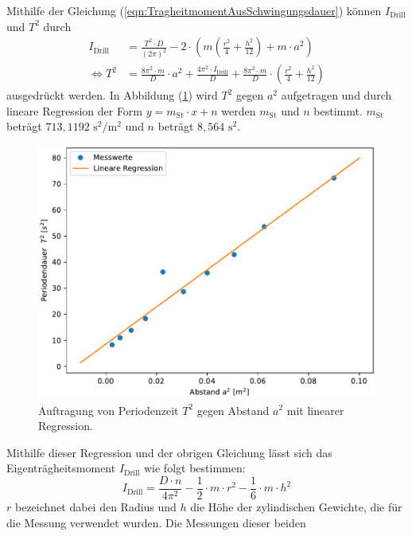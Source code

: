   Mithilfe der Gleichung (\ref{eqn:TragheitmomentAusSchwingungsdauer})
  können $I_{\text{Drill}}$ und $T^2$ durch
  \begin{align}
    I_{\text{Drill}} &= \frac{T^{2} \cdot D}{\left(2 \pi\right)^{2}} - 2 \cdot \left(m \left(\frac{r^{2}}{4} + \frac{h^{2}}{12} \right) + m \cdot a^2 \right) \\
    \Leftrightarrow T^2 &= \frac{8 \pi^2 \cdot m}{D} \cdot a^2 + \frac{4 \pi^2 \cdot I_{\text{Drill}}}{D} + \frac{8\pi^2 \cdot m}{D} \cdot \left( \frac{r^2}{4} + \frac{h^2}{12} \right)
  \end{align}
  ausgedrückt werden.
  In Abbildung (\ref{fig:plot}) wird $T^2$ gegen $a^2$ aufgetragen und durch lineare Regression der Form $y = m_{\text{St}} \cdot x + n$ werden $m_{\text{St}}$ und $n$ bestimmt.
  $m_{\text{St}}$ beträgt $713,1192 \,\, \unit{\second\squared\per\meter\squared}$ und $n$ beträgt $8,564\,\, \unit{\second\squared}$. 
  \begin{figure}[H]
    \centering
    \includegraphics{plot.pdf}
    \caption{Auftragung von Periodenzeit $T^2$ gegen Abstand $a^2$ mit linearer Regression.}
    \label{fig:plot}
  \end{figure}
  Mithilfe dieser Regression und der obrigen Gleichung lässt sich das Eigenträgheitsmoment $I_{\text{Drill}}$ wie folgt bestimmen: 
  \begin{equation}
    I_{\text{Drill}} = \frac{D \cdot n}{4 \pi^2} - \frac{1}{2} \cdot m \cdot r^2 - \frac{1}{6} \cdot m \cdot h^2
  \end{equation}
  $r$ bezeichnet dabei den Radius und $h$ die Höhe der zylindischen Gewichte, die für die Messung verwendet wurden. Die Messungen dieser beiden
